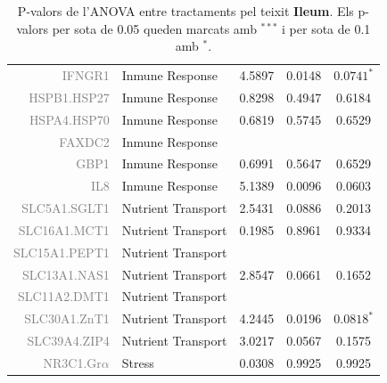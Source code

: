 \documentclass[english]{article}
\begin{document}
\begin{table}[ht]
\begin{tabular}{rlrrc}
  {\textcolor{gray}{IFNGR1}} & Inmune Response & 4.5897 & 0.0148 & $0.0741^{*}$ \\
  {\textcolor{gray}{HSPB1.HSP27}} & Inmune Response & 0.8298 & 0.4947 & 0.6184 \\
  {\textcolor{gray}{HSPA4.HSP70}} & Inmune Response & 0.6819 & 0.5745 & 0.6529 \\
  {\textcolor{gray}{FAXDC2}} & Inmune Response &  &  &  \\
  {\textcolor{gray}{GBP1}} & Inmune Response & 0.6991 & 0.5647 & 0.6529 \\
  {\textcolor{gray}{IL8}} & Inmune Response & 5.1389 & 0.0096 & 0.0603 \\
  {\textcolor{gray}{SLC5A1.SGLT1}} & Nutrient Transport& 2.5431 & 0.0886 & 0.2013 \\
  {\textcolor{gray}{SLC16A1.MCT1}} & Nutrient Transport & 0.1985 & 0.8961 & 0.9334 \\
  {\textcolor{gray}{SLC15A1.PEPT1}} & Nutrient Transport &  &  &  \\
  {\textcolor{gray}{SLC13A1.NAS1}} & Nutrient Transport & 2.8547 & 0.0661 & 0.1652 \\
  {\textcolor{gray}{SLC11A2.DMT1}} & Nutrient Transport &  &  &  \\
  {\textcolor{gray}{SLC30A1.ZnT1}} & Nutrient Transport & 4.2445 & 0.0196 & $0.0818^{*}$ \\
  {\textcolor{gray}{SLC39A4.ZIP4}} & Nutrient Transport & 3.0217 & 0.0567 & 0.1575 \\
  {\textcolor{gray}{NR3C1.Gr$\alpha$}} & Stress & 0.0308 & 0.9925 & 0.9925 \\
   \bottomrule
\end{tabular}
\caption{P-valors de l'ANOVA entre tractaments pel teixit \textbf{Ileum}. Els p-valors per sota de 0.05 queden marcats amb $^{***}$ i per sota de 0.1 amb $^{*}$.}
\end{table}
\end{document}
